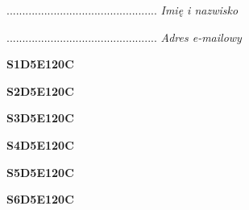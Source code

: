 \begin{turn}{90}\begin{minipage}{\linewidth} \vspace{20mm} ................................................  \textit{Imię i nazwisko}\end{minipage}\end{turn}

\begin{turn}{90}\begin{minipage}{\linewidth} \vspace{20mm} ................................................  \textit{Adres e-mailowy}\end{minipage}\end{turn}

\begin{turn}{90}\huge \begin{minipage}{\linewidth} \vspace{10mm}\textbf{S1D5E120C}\end{minipage}\end{turn}

\begin{turn}{90}\huge \begin{minipage}{\linewidth} \vspace{10mm}\textbf{S2D5E120C}\end{minipage}\end{turn}

\begin{turn}{90}\huge \begin{minipage}{\linewidth} \vspace{10mm}\textbf{S3D5E120C}\end{minipage}\end{turn}

\begin{turn}{90}\huge \begin{minipage}{\linewidth} \vspace{10mm}\textbf{S4D5E120C}\end{minipage}\end{turn}

\begin{turn}{90}\huge \begin{minipage}{\linewidth} \vspace{10mm}\textbf{S5D5E120C}\end{minipage}\end{turn}

\begin{turn}{90}\huge \begin{minipage}{\linewidth} \vspace{10mm}\textbf{S6D5E120C}\end{minipage}\end{turn}

